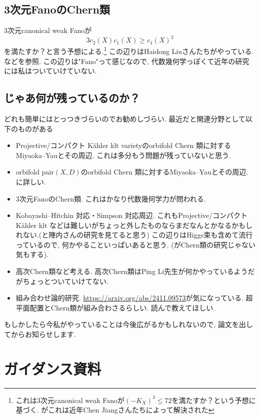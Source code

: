 \documentclass[dvipdfmx,a4paper,11pt]{article} %
\theoremstyle{definition}
\theoremstyle{remark}
\numberwithin{equation}{section}
\begin{document}
\subsection{3次元FanoのChern類}
3次元canonical weak Fanoが
$$
3c_2(X)c_1(X) \ge c_1(X)^3
$$
を満たすか？と言う予想による.\footnote{これは3次元canonical weak Fanoが$(-K_X)^3 \le 72$を満たすか？という予想に基づく. がこれは近年Chen Jiangさんたちによって解決された} 
この辺りはHaidong Liuさんたちがやっている. \cite{IJL23, LL23, LL24}などを参照. この辺りは"Fano"って感じなので, 代数幾何学っぽくて近年の研究には私はついていけていない.

\subsection{じゃあ何が残っているのか？}
どれも簡単にはとっつきづらいのでお勧めしづらい.
最近だと関連分野として以下のものがある
\begin{itemize}
\item Projective/コンパクト Kähler klt varietyのorbifold Chern 類に対するMiyaoka--Yauとその周辺. これは多分もう問題が残っていないと思う.
\item orbifold pair$(X, D)$のorbifold Chern 類に対するMiyaoka--Yauとその周辺. \cite{CGG23}に詳しい. 
\item 3次元FanoのChern類. これはかなり代数幾何学力が問われる.
\item Kobayashi--Hitchin 対応・Simpson 対応周辺. これもProjective/コンパクト Kähler klt などは難しいがちょっと外したものならまだなんとかなるかもしれない.(と陣内さんの研究を見てると思う) この辺りはHiggs束も含めて流行っているので, 何かやることいっぱいあると思う. (がChern類の研究じゃない気もする). 
\item 高次Chern類など考える. 高次Chern類はPing Li先生が何かやっているようだがちょっとついていけてない. 
\item 組み合わせ論的研究. \url{https://arxiv.org/abs/2411.09573}が気になっている. 超平面配置とChern類が組み合わさるらしい. 読んで教えてほしい. 
\end{itemize}

もしかしたら今私がやっていることは今後広がるかもしれないので, 論文を出してからお知らせします. 

\newpage




\newpage
\renewcommand{\thesection}{\Alph{section}} \setcounter{section}{0}
\section{ガイダンス資料}
\end{document}
